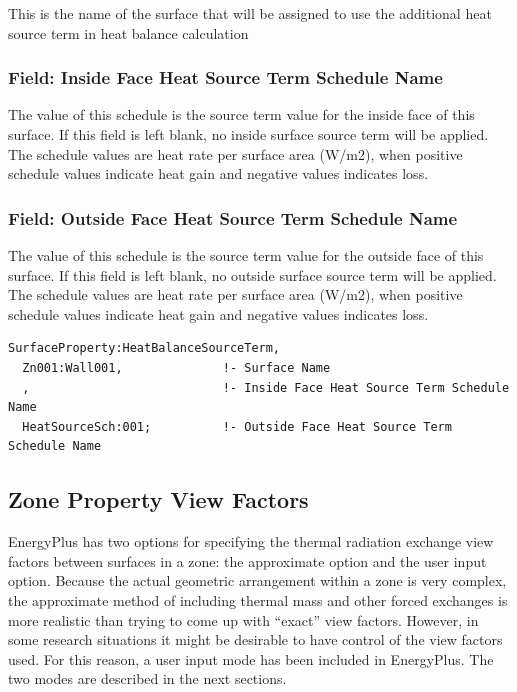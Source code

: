 This is the name of the surface that will be assigned to use the additional heat source term in heat balance calculation

\subsubsection{Field: Inside Face Heat Source Term Schedule Name}\label{field-inside-heat-source-term-schedule-name}

The value of this schedule is the source term value for the inside face of this surface. If this field is left blank, no inside surface source term will be applied. The schedule values are heat rate per surface area (W/m2), when positive schedule values indicate heat gain and negative values indicates loss.

\subsubsection{Field: Outside Face Heat Source Term Schedule Name}\label{field-outside-heat-source-term-schedule-name}

The value of this schedule is the source term value for the outside face of this surface. If this field is left blank, no outside surface source term will be applied. The schedule values are heat rate per surface area (W/m2), when positive schedule values indicate heat gain and negative values indicates loss.

\begin{lstlisting}
SurfaceProperty:HeatBalanceSourceTerm,
  Zn001:Wall001,              !- Surface Name
  ,                           !- Inside Face Heat Source Term Schedule Name
  HeatSourceSch:001;          !- Outside Face Heat Source Term Schedule Name
\end{lstlisting}

\subsection{Zone Property View Factors}\label{zone-property-view-factors}

EnergyPlus has two options for specifying the thermal radiation exchange view factors between surfaces in a zone: the approximate option and the user input option. Because the actual geometric arrangement within a zone is very complex, the approximate method of including thermal mass and other forced exchanges is more realistic than trying to come up with ``exact'' view factors. However, in some research situations it might be desirable to have control of the view factors used. For this reason, a user input mode has been included in EnergyPlus. The two modes are described in the next sections.

